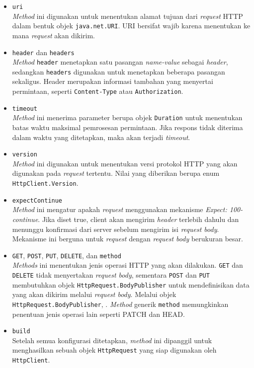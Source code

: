 \begin{itemize}
    \item \texttt{uri}\\
    \textit{Method} ini digunakan untuk menentukan alamat tujuan dari \textit{request} HTTP dalam bentuk objek \texttt{java.net.URI}. URI bersifat wajib karena menentukan ke mana \textit{request} akan dikirim.
    
    \item \texttt{header} dan \texttt{headers}\\
    \textit{Method} \texttt{header} menetapkan satu pasangan \textit{name-value} sebagai \textit{header}, sedangkan \texttt{headers} digunakan untuk menetapkan beberapa pasangan sekaligus. Header merupakan informasi tambahan yang menyertai permintaan, seperti \texttt{Content-Type} atau \texttt{Authorization}.
    
    \item \texttt{timeout}\\
    \textit{Method} ini menerima parameter berupa objek \texttt{Duration} untuk menentukan batas waktu maksimal pemrosesan permintaan. Jika respons tidak diterima dalam waktu yang ditetapkan, maka akan terjadi \textit{timeout}.
    
    \item \texttt{version}\\
    \textit{Method} ini digunakan untuk menentukan versi protokol HTTP yang akan digunakan pada \textit{request} tertentu. Nilai yang diberikan berupa enum \texttt{HttpClient.Version}.
    
    \item \texttt{expectContinue}\\
    \textit{Method} ini mengatur apakah \textit{request} menggunakan mekanisme \textit{Expect: 100-continue}. Jika diset true, client akan mengirim \textit{header} terlebih dahulu dan menunggu konfirmasi dari server sebelum mengirim isi \textit{request body}. Mekanisme ini berguna untuk \textit{request} dengan \textit{request body} berukuran besar.
    
    \item \texttt{GET}, \texttt{POST}, \texttt{PUT}, \texttt{DELETE}, dan \texttt{method}\\
    \textit{Methods} ini menentukan jenis operasi HTTP yang akan dilakukan. \texttt{GET} dan \texttt{DELETE} tidak menyertakan \textit{request body}, sementara \texttt{POST} dan \texttt{PUT} membutuhkan objek \texttt{HttpRequest.BodyPublisher} untuk mendefinisikan data yang akan dikirim melalui \textit{request body}. Melalui objek \texttt{HttpRequest.BodyPublisher}, . \textit{Method} generik \texttt{method} memungkinkan penentuan jenis operasi lain seperti PATCH dan HEAD.

    
    \item \texttt{build}\\
    Setelah semua konfigurasi ditetapkan, \textit{method} ini dipanggil untuk menghasilkan sebuah objek \texttt{HttpRequest} yang siap digunakan oleh \texttt{HttpClient}.
\end{itemize}



